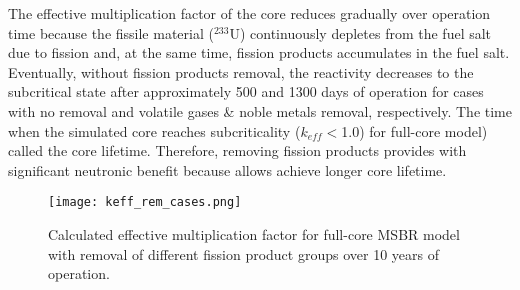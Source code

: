 The effective multiplication factor of the core reduces gradually over operation 
time because the fissile material ($^{233}$U) continuously depletes from the 
fuel salt due to fission and, at the same time, fission products accumulates in 
the fuel salt.	Eventually, without fission products removal, the reactivity 
decreases to the subcritical state after approximately 500 and 1300 days of 
operation for cases with no removal and volatile gases \& noble metals removal, 
respectively. The time when the simulated core reaches subcriticality 
($k_{eff}<$1.0) for full-core model) called the core lifetime. Therefore, 
removing fission products provides with significant neutronic benefit because 
allows achieve longer core lifetime.
\begin{figure}[ht!] %
  \centering
  \texttt{[image: keff\_rem\_cases.png]} 
  \caption{Calculated effective multiplication factor for full-core \gls{MSBR} 
model with removal of different fission product groups over 10 years of 
operation.}
  \label{fig:fp_removal}
\end{figure}


